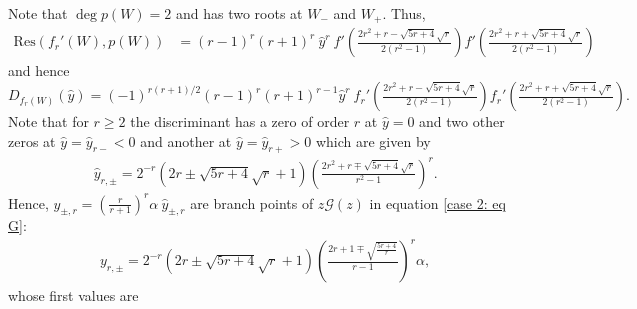 \documentclass[12pt]{article}
\newcommand{\Gt}{\mathcal{G}} %
\numberwithin{equation}{section}
\begin{document}
Note that $\deg p(W)=2$ and has two roots at $W_{-}$ and $W_{+}$. Thus, 
\begin{align*}
	\mathrm{Res}(f_r'(W),p(W))
	&=	(r-1)^r (r+1)^{r} \ \hat{y}^r\ f'\left(\tfrac{2 r^2+r-\sqrt{5 r+4} \sqrt{r}}{2
   \left(r^2-1\right)}\right) f'\left(\tfrac{2 r^2+r+\sqrt{5 r+4}
   \sqrt{r}}{2 \left(r^2-1\right)}\right) 
\end{align*}
and hence 
\[
	D_{f_r(W)}(\hat{y}) = (-1)^{r (r+1)/2} (r-1)^r (r+1)^{r-1} \hat{y}^r \  f_r'\left(\tfrac{2 r^2+r-\sqrt{5 r+4} \sqrt{r}}{2
   \left(r^2-1\right)}\right) f_r'\left(\tfrac{2 r^2+r+\sqrt{5 r+4}
   \sqrt{r}}{2 \left(r^2-1\right)}\right) . 
\]
Note that for $r\geq 2$ the discriminant 
  has a zero of order $r$ at $\hat{y}=0$ and two other zeros at $\hat{y}=\hat{y}_{r-}<0$  and another at $\hat{y}=\hat{y}_{r+}>0$ which are given by 
\begin{align*}
&  \hat{y}_{r,\pm} = 2^{-r} \left(2 r\pm\sqrt{5 r+4}
   \sqrt{r}+1\right) \left(\frac{2 r^2+r\mp \sqrt{5 r+4}
   \sqrt{r}}{r^2-1}\right)^r . 
\end{align*}
%
Hence, $y_{\pm,r}= \left(\frac{r}{r+1}\right)^r \alpha\ \hat{y}_{\pm,r}$ are branch points of $z\Gt(z)$ in equation \eqref{case 2: eq G}: 
\begin{align}
\label{branch pts Case2}
&  {y}_{r,\pm} = 2^{-r} \left(2 r\pm\sqrt{5 r+4}
   \sqrt{r}+1\right) \left(\frac{2 r+1\mp\sqrt{\frac{5 r+4}{r}}}{r-1}\right)^r \alpha,
\end{align}
whose first values are 
\end{document}
